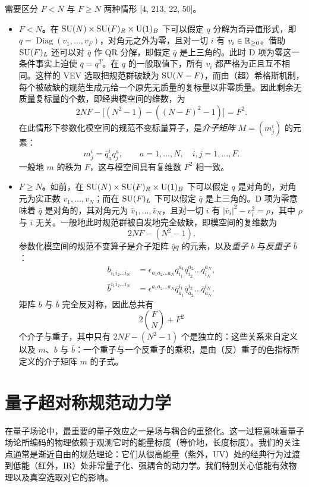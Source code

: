 需要区分 $F<N$ 与 $F\ge N$ 两种情形 [4, 213, 22, 50]。

\begin{itemize}
\item \textbf{$F<N$。}在 $\operatorname{SU}(N)\times\operatorname{SU}(F)_R\times\operatorname{U}(1)_B$ 下可以假定 $q$ 分解为奇异值形式，即 $q=\operatorname{Diag}(v_1,\dots,v_F)$，对角元之外为零，且对一切 $i$ 有 $v_i\in\mathbb{R}_{\ge0}$。借助 $\operatorname{SU}(F)_L$ 还可以对 $\bar q$ 作 QR 分解，即假定 $\bar q$ 是上三角的。此时 D 项为零这一条件事实上迫使 $\bar q=q^T$。在 $q$ 的一般取值下，所有 $v_i$ 都严格为正且互不相同。这样的 VEV 选取把规范群破缺为 $\operatorname{SU}(N-F)$，而由（超）希格斯机制，每个被破缺的规范生成元给一个原先无质量的复标量以非零质量。因此剩余无质量复标量的个数，即经典模空间的维数，为
\[
2NF-\bigl[(N^2-1)-((N-F)^2-1)\bigr]=F^2.
\]
在此情形下参数化模空间的规范不变标量算子，是\emph{介子矩阵} $M=(m^i_j)$ 的元素：
\[
m^i_j=\bar q^i_a q^a_j,\qquad a=1,\dots,N,\quad i,j=1,\dots,F.
\]
一般地 $m$ 的秩为 $F$，这与模空间具有复维数 $F^2$ 相一致。
\item \textbf{$F\ge N$。}如前，在 $\operatorname{SU}(N)\times\operatorname{SU}(F)_R\times\operatorname{U}(1)_B$ 下可以假定 $q$ 是对角的，对角元为实正数 $v_1,\dots,v_N$；而在 $\operatorname{SU}(F)_L$ 下可以假定 $\bar q$ 是上三角的。D 项为零意味着 $\bar q$ 是对角的，其对角元为 $\bar v_1,\dots,\bar v_N$，且对一切 $i$ 有 $|\bar v_i|^2-v_i^2=\rho$，其中 $\rho$ 与 $i$ 无关。一般地此时规范群被自发地完全破缺，即模空间的复维数为
\[
2NF-(N^2-1).
\]
参数化模空间的规范不变算子是介子矩阵 $\bar q q$ 的元素，以及\emph{重子} $b$ 与\emph{反重子} $\bar b$：
\[
\begin{aligned}
b_{i_1i_2\dots i_N}&=\epsilon_{a_1a_2\dots a_N}q^{a_1}_{i_1}q^{a_2}_{i_2}\dots q^{a_N}_{i_N},\\
\bar b^{i_1i_2\dots i_N}&=\epsilon^{a_1a_2\dots a_N}\bar q^{i_1}_{a_1}\bar q^{i_2}_{a_2}\dots\bar q^{i_N}_{a_N}.
\end{aligned}
\]
矩阵 $b$ 与 $\bar b$ 完全反对称，因此总共有
\[
2\binom{F}{N}+F^2
\]
个介子与重子，其中只有 $2NF-(N^2-1)$ 个是独立的：这些关系来自定义以及 $m$、$b$ 与 $\bar b$：一个重子与一个反重子的乘积，是由（反）重子的色指标所定义的介子矩阵 $m$ 的子式。
\end{itemize}

\section{量子超对称规范动力学}

在量子场论中，最重要的量子效应之一是场与耦合的重整化。这一过程意味着量子场论所编码的物理依赖于观测它时的能量标度（等价地，长度标度）。我们的关注点通常是渐近自由的规范理论：它们从很高能量（紫外，UV）处的经典行为过渡到低能（红外，IR）处非常量子化、强耦合的动力学。我们特别关心低能有效物理以及真空选取对它的影响。

